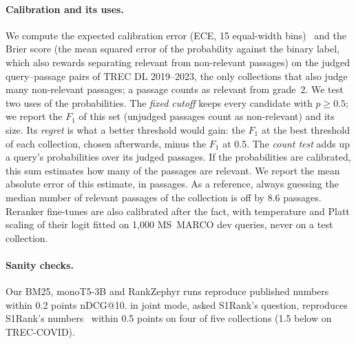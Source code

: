 \paragraph{Calibration and its uses.}
We compute the expected calibration error (ECE, 15 equal-width bins)~\cite{Guo2017Calibration} and the Brier score
(the mean squared error of the probability against the binary label, which also rewards separating relevant from
non-relevant passages) on the judged query--passage pairs of TREC DL 2019--2023, the only collections that also judge
many non-relevant passages; a passage counts as relevant from grade~2. We test two uses of the probabilities. The \emph{fixed cutoff} keeps every candidate with $p \ge 0.5$; we report the
$F_1$ of this set (unjudged passages count as non-relevant) and its size. Its \emph{regret} is what a better threshold
would gain: the $F_1$ at the best threshold of each collection, chosen afterwards, minus the $F_1$ at 0.5. The
\emph{count test} adds up a query's probabilities over its judged passages. If the probabilities are calibrated, this
sum estimates how many of the passages are relevant. We report the mean absolute error of this estimate, in
passages. As a reference, always guessing the median number of relevant passages of the collection is off by 8.6
passages. Reranker fine-tunes are also calibrated after the fact, with
temperature and Platt scaling of their logit fitted on 1,000 MS~MARCO dev queries, never on a test collection.

\paragraph{Sanity checks.}
Our BM25, monoT5-3B and RankZephyr runs reproduce published numbers~\cite{Pyserini2CR,Abdallah2025HowGood} within 0.2
points nDCG@10. \jev{} in joint mode, asked S1Rank's question, reproduces S1Rank's numbers~\cite{S1Rank} within 0.5
points on four of five collections (1.5 below on TREC-COVID).
